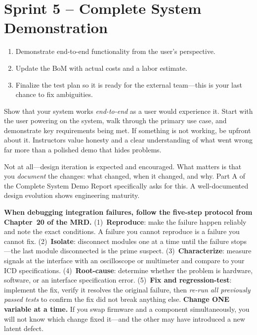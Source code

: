 \documentclass[11pt,letterpaper]{article}
\begin{document}
\section{Sprint 5 -- Complete System Demonstration}

\begin{priorities}
\begin{enumerate}[leftmargin=*, itemsep=1pt, topsep=0pt]
    \item Demonstrate end-to-end functionality from the user's perspective.
    \item Update the BoM with actual costs and a labor estimate.
    \item Finalize the test plan so it is ready for the external team---this is your last chance to fix ambiguities.
\end{enumerate}
\end{priorities}

\begin{faqbox}
Show that your system works \textit{end-to-end} as a user would experience it. Start with the user powering on the system, walk through the primary use case, and demonstrate key requirements being met. If something is not working, be upfront about it. Instructors value honesty and a clear understanding of what went wrong far more than a polished demo that hides problems.
\end{faqbox}

\begin{faqbox}
Not at all---design iteration is expected and encouraged. What matters is that you \textit{document} the changes: what changed, when it changed, and why. Part A of the Complete System Demo Report specifically asks for this. A well-documented design evolution shows engineering maturity.
\end{faqbox}

\begin{protip}
\textbf{When debugging integration failures, follow the five-step protocol from Chapter~20 of the MRD.} (1)~\textbf{Reproduce}: make the failure happen reliably and note the exact conditions. A failure you cannot reproduce is a failure you cannot fix. (2)~\textbf{Isolate}: disconnect modules one at a time until the failure stops---the last module disconnected is the prime suspect. (3)~\textbf{Characterize}: measure signals at the interface with an oscilloscope or multimeter and compare to your ICD specifications. (4)~\textbf{Root-cause}: determine whether the problem is hardware, software, or an interface specification error. (5)~\textbf{Fix and regression-test}: implement the fix, verify it resolves the original failure, then \textit{re-run all previously passed tests} to confirm the fix did not break anything else. \textbf{Change ONE variable at a time.} If you swap firmware and a component simultaneously, you will not know which change fixed it---and the other may have introduced a new latent defect.
\end{protip}
\end{document}

